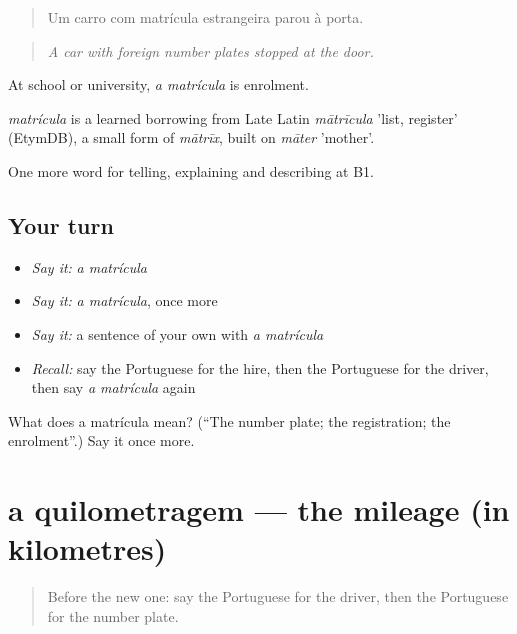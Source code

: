 \begin{quote}
Um carro com matrícula estrangeira parou à porta.
\end{quote}

\begin{quote}
\emph{A car with foreign number plates stopped at the door.}
\end{quote}

At school or university, \emph{a matrícula} is enrolment.

\begin{cousinweb}
\emph{matrícula} is a learned borrowing from Late Latin \emph{mātrīcula} 'list, register' (EtymDB), a small form of \emph{mātrīx}, built on \emph{māter} 'mother'.
\end{cousinweb}

\begin{grammarlens}[title={What you've built}]
One more word for telling, explaining and describing at B1.
\end{grammarlens}

\subsection*{Your turn}
\begin{itemize}
\raggedright
  \item \emph{Say it:} \emph{a matrícula}
  \item \emph{Say it:} \emph{a matrícula}, once more
  \item \emph{Say it:} a sentence of your own with \emph{a matrícula}
  \item \emph{Recall:} say the Portuguese for the hire, then the Portuguese for the driver, then say \emph{a matrícula} again
\end{itemize}

\begin{tcolorbox}[breakable,colback=teal!4,colframe=teal!35!black,title={Before you move on}]
What does a matrícula mean? (\textquotedblleft{}The number plate; the registration; the enrolment\textquotedblright{}.) Say it once more.
\end{tcolorbox}
\section[a quilometragem]{a quilometragem — the mileage (in kilometres)}

\label{lesson:PT-C411-quilometragem}



\begin{quote}
Before the new one: say the Portuguese for the driver, then the Portuguese for the number plate.
\end{quote}

